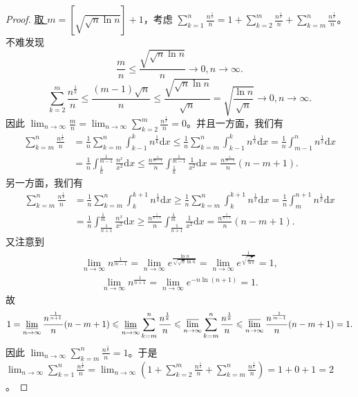 \documentclass[../../main.tex]{subfiles}%
\begin{document}
\begin{proof}

\hyperlink{取m的原因}{取 \(m = [\sqrt{\sqrt{n}\ln n}]+1\)}，考虑 \(\sum\limits_{k = 1}^n\frac{n^{\frac{1}{k}}}{n}=1+\sum\limits_{k = 2}^m\frac{n^{\frac{1}{k}}}{n}+\sum\limits_{k = m}^n\frac{n^{\frac{1}{k}}}{n}\)。不难发现
\[
\frac{m}{n}\leqslant \frac{\sqrt{\sqrt{n}\ln n}}{n}\rightarrow 0,n\rightarrow \infty.
\]
\[
\sum\limits_{k = 2}^m\frac{n^{\frac{1}{k}}}{n}\leqslant \frac{(m - 1)\sqrt{n}}{n}\leqslant \frac{\sqrt{\sqrt{n}\ln n}}{\sqrt{n}}=\sqrt{\frac{\ln n}{\sqrt{n}}}\rightarrow 0,n\rightarrow \infty.
\]
因此 \(\lim_{n\rightarrow \infty}\frac{m}{n}=\lim_{n\rightarrow \infty}\sum\limits_{k = 2}^m\frac{n^{\frac{1}{k}}}{n}=0\)。并且一方面，我们有
\begin{align*}
\sum\limits_{k=m}^n{\frac{n^{\frac{1}{k}}}{n}}&=\frac{1}{n}\sum\limits_{k=m}^n{\int_{k-1}^k{n^{\frac{1}{k}}\mathrm{d}x}}\leqslant \frac{1}{n}\sum\limits_{k=m}^n{\int_{k-1}^k{n^{\frac{1}{x}}\mathrm{d}x}}=\frac{1}{n}\int_{m-1}^n{n^{\frac{1}{x}}\mathrm{d}x}
\\
&=\frac{1}{n}\int_{\frac{1}{n}}^{\frac{1}{m-1}}{\frac{n^x}{x^2}\mathrm{d}x}\leqslant \frac{n^{\frac{1}{m-1}}}{n}\int_{\frac{1}{n}}^{\frac{1}{m-1}}{\frac{1}{x^2}\mathrm{d}x}=\frac{n^{\frac{1}{m-1}}}{n}\left( n-m+1 \right) .
\end{align*}
另一方面，我们有
\begin{align*}
\sum\limits_{k=m}^n{\frac{n^{\frac{1}{k}}}{n}}&=\frac{1}{n}\sum\limits_{k=m}^n{\int_k^{k+1}{n^{\frac{1}{k}}\mathrm{d}x}}\geqslant \frac{1}{n}\sum\limits_{k=m}^n{\int_k^{k+1}{n^{\frac{1}{x}}\mathrm{d}x}}=\frac{1}{n}\int_m^{n+1}{n^{\frac{1}{x}}\mathrm{d}x}
\\
&=\frac{1}{n}\int_{\frac{1}{n+1}}^{\frac{1}{m}}{\frac{n^x}{x^2}\mathrm{d}x}\geqslant \frac{n^{\frac{1}{n+1}}}{n}\int_{\frac{1}{n+1}}^{\frac{1}{m}}{\frac{1}{x^2}\mathrm{d}x}=\frac{n^{\frac{1}{n+1}}}{n}\left( n-m+1 \right) .
\end{align*}
又注意到
\begin{align*}
\lim_{n\rightarrow \infty}n^{\frac{1}{m - 1}}=\lim_{n\rightarrow \infty}e^{\frac{\ln n}{\sqrt{\sqrt{n}\ln n}}}
=\lim_{n\rightarrow \infty}e^{\frac{1}{\sqrt{\frac{\sqrt{n}}{\ln n}}}}
=1,
\end{align*}
\begin{align*}
\lim_{n\rightarrow \infty} n^{\frac{1}{n+1}}=\lim_{n\rightarrow \infty} e^{-n\ln \left( n+1 \right)}=1.
\end{align*}
故
\[
1=\varliminf_{n\rightarrow \infty}\frac{n^{\frac{1}{n+1}}}{n}(n - m + 1)\leqslant \varliminf_{n\rightarrow \infty}\sum\limits_{k = m}^n\frac{n^{\frac{1}{k}}}{n}\leqslant \varlimsup_{n\rightarrow \infty}\sum\limits_{k = m}^n\frac{n^{\frac{1}{k}}}{n}\leqslant \varlimsup_{n\rightarrow \infty}\frac{n^{\frac{1}{m - 1}}}{n}(n - m + 1)=1.
\]
因此 \(\lim_{n\rightarrow \infty}\sum\limits_{k = m}^n\frac{n^{\frac{1}{k}}}{n}=1\)。于是 \(\lim_{n\rightarrow \infty}\sum\limits_{k = 1}^n\frac{n^{\frac{1}{k}}}{n}=\lim_{n\rightarrow \infty}\left(1+\sum\limits_{k = 2}^m\frac{n^{\frac{1}{k}}}{n}+\sum\limits_{k = m}^n\frac{n^{\frac{1}{k}}}{n}\right)=1 + 0+1 = 2\)。

\end{proof}
\end{document}
